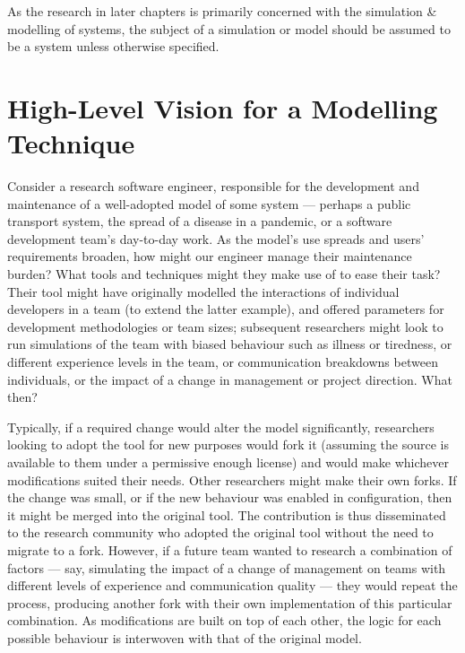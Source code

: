 As the research in later chapters is primarily concerned with the simulation \&
modelling of \sociotechnical systems, the subject of a simulation or model
should be assumed to be a \sociotechnical system unless otherwise specified.




\section{High-Level Vision for a \SocioTechnical Modelling Technique}
\label{intro_high_level_vision}

Consider a research software engineer, responsible for the development and
maintenance of a well-adopted model of some \sociotechnical system --- perhaps a
public transport system, the spread of a disease in a pandemic, or a software
development team's day-to-day work. As the model's use spreads and users'
requirements broaden, how might our engineer manage their maintenance burden?
What tools and techniques might they make use of to ease their task? Their tool
might have originally modelled the interactions of individual developers in a
team (to extend the latter example), and offered parameters for development
methodologies or team sizes; subsequent researchers might look to run
simulations of the team with biased behaviour such as illness or tiredness, or
different experience levels in the team, or communication breakdowns between
individuals, or the impact of a change in management or project direction. What
then?

Typically, if a required change would alter the model significantly, researchers
looking to adopt the tool for new purposes would fork it (assuming the source is
available to them under a permissive enough license) and would make whichever
modifications suited their needs. Other researchers might make their own forks.
If the change was small, or if the new behaviour was enabled in configuration,
then it might be merged into the original tool. The contribution is thus
disseminated to the research community who adopted the original tool without the
need to migrate to a fork. However, if a future team wanted to research a
combination of factors --- say, simulating the impact of a change of management
on teams with different levels of experience and communication quality --- they
would repeat the process, producing another fork with their own implementation
of this particular combination. As modifications are built on top of each other,
the logic for each possible behaviour is interwoven with that of the original
model.

